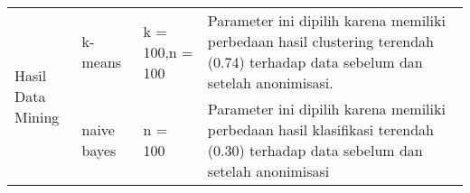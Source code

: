 \begin{table}[h]
\begin{tabular}{|p{3cm}|p{3cm}|p{3cm}|p{5.5cm}|}
    \hline
    \multirow{2}{*}{\parbox{3cm}{\vspace{0.5cm} Hasil \newline Data Mining}} & \parbox{3cm}{\vspace{0.5cm} k-means \newline} & k = 100,\newline n = 100 & Parameter ini dipilih karena memiliki perbedaan hasil clustering terendah (0.74) terhadap data sebelum dan setelah anonimisasi.\newline \\ 
     & \parbox{3cm}{\vspace{0.5cm} naive bayes \newline} & n = 100 & Parameter ini dipilih karena memiliki perbedaan hasil klasifikasi terendah (0.30) terhadap data sebelum dan setelah anonimisasi \\
    \hline
    \end{tabular}
\label{table:kesimpulan_eksperimen}
\end{table}
